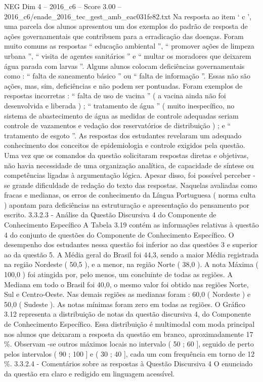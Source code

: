 \begin{textsample}{NEG Dim 4 – 2016\_c6 – Score 3.00 – 2016\_c6/enade\_2016\_tec\_gest\_amb\_eac031fe82.txt}
Na resposta ao item ‘ c ’, uma parcela dos alunos apresentou um dos exemplos do padrão de resposta de ações governamentais que contribuem para a erradicação das doenças.
Foram muito comuns as respostas “ educação ambiental ”, “ promover ações de limpeza urbana ”, “ visita de agentes sanitários ” e “ multar os moradores que deixarem água parada com larvas ”.
Alguns alunos colocam deficiências governamentais como : “ falta de saneamento básico ” ou “ falta de informação ”.
Essas não são ações, mas, sim, deficiências e não podem ser pontuadas.
Foram exemplos de respostas incorretas : “ falta de uso de vacina ” ( a vacina ainda não foi desenvolvida e liberada ) ; “ tratamento de água ” ( muito inespecífico, no sistema de abastecimento de água as medidas de controle adequadas seriam controle de vazamentos e vedação dos reservatórios de distribuição ) ; e “ tratamento de esgoto ”.
As respostas dos estudantes revelaram um adequado conhecimento dos conceitos de epidemiologia e controle exigidos pela questão.
Uma vez que os comandos da questão solicitaram respostas diretas e objetivas, não havia necessidade de uma organização analítica, de capacidade de síntese ou competências ligadas à argumentação lógica.
Apesar disso, foi possível perceber -se grande dificuldade de redação do texto das respostas.
Naquelas avaliadas como fracas e medianas, os erros de conhecimento da Língua Portuguesa ( norma culta ) apontam para deficiências na estruturação e apresentação do pensamento por escrito. 3.3.2.3 - Análise da Questão Discursiva 4 do Componente de Conhecimento Específico A Tabela 3.19 contém as informações relativas à questão 4 do conjunto de questões do Componente de Conhecimento Específico.
O desempenho dos estudantes nessa questão foi inferior ao das questões 3 e superior ao da questão 5.
A Média geral do Brasil foi 44,3, sendo a maior Média registrada na região Nordeste ( 50,5 ), e a menor, na região Norte ( 38,0 ).
A nota Máxima ( 100,0 ) foi atingida por, pelo menos, um concluinte de todas as regiões.
A Mediana em todo o Brasil foi 40,0, o mesmo valor foi obtido nas regiões Norte, Sul e Centro-Oeste.
Nas demais regiões as medianas foram : 60,0 ( Nordeste ) e 50,0 ( Sudeste ).
As notas mínimas foram zero em todas as regiões.
O Gráfico 3.12 representa a distribuição de notas da questão discursiva 4, do Componente de Conhecimento Específico.
Essa distribuição é multimodal com moda principal nos alunos que deixaram a resposta da questão em branco, aproximadamente 17 \%.
Observam -se outros máximos locais no intervalo ( 50 ; 60 ], seguido de perto pelos intervalos ( 90 ; 100 ] e ( 30 ; 40 ], cada um com frequência em torno de 12 \%. 3.3.2.4 - Comentários sobre as respostas à Questão Discursiva 4 O enunciado da questão era claro e redigido em linguagem acessível.

\end{textsample}
